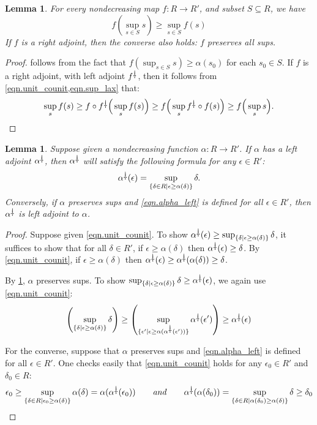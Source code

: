 \documentclass[11pt, one side, article]{memoir}
\theoremstyle{definition}
\theoremstyle{plain}
\newtheorem{lemma}[definitionx]{Lemma}
\renewcommand{\ss}{\subseteq}
\newcommand{\ldag}{^{\rotatebox{180}{$\dagger$}}}
\newcommand{\tn}[1]{\textnormal{#1}}
\newcommand{\hh}[2][]{#1 \tn{\textit{#2}} #1}
\newcommand{\qqand}{\hh[\qquad]{and}}
\begin{document}
\begin{lemma}\label{lemma.radj_sups}
For every nondecreasing map $f\colon R\to R'$, and subset $S\ss R$, we have
\begin{equation}\label{eqn.sup_lax}
	f(\sup_{s\in S}s)
	\geq
	\sup_{s\in S}f(s)
\end{equation}
If $f$ is a right adjoint, then the converse also holds: $f$ preserves all sups.
\end{lemma}
\begin{proof}
	 follows from the fact that $f(\sup_{s\in S}s)\geq\alpha (s_0)$ for each $s_0\in S$. If $f$ is a right adjoint, with left adjoint $f\ldag$, then it follows from \cref{eqn.unit_counit,eqn.sup_lax} that:
	\[
	\sup_s f(s)\geq
	f\circ f\ldag\Big(\sup_s f(s)\Big)\geq
	f\Big(\sup_s f\ldag\circ f(s)\Big)\geq
	f\Big(\sup_s s\Big).
	\qedhere
	\]
\end{proof}


\begin{lemma}\label{lemma.sup_formula}
Suppose given a nondecreasing function $\alpha\colon R\to R'$. If $\alpha$ has a left adjoint $\alpha\ldag$, then $\alpha\ldag$ will satisfy the following formula for any $\epsilon\in R'$:
\begin{equation}\label{eqn.alpha_left}
  \alpha\ldag(\epsilon)=\sup_{\{\delta\in R\mid \epsilon\geq\alpha(\delta)\}}\delta.
\end{equation}
Conversely, if $\alpha$ preserves sups and \eqref{eqn.alpha_left} is defined for all $\epsilon\in R'$, then $\alpha\ldag$ is left adjoint to $\alpha$.
\end{lemma}
\begin{proof}
Suppose given \eqref{eqn.unit_counit}. To show $\alpha\ldag(\epsilon)\geq\sup_{\{\delta\mid \epsilon\geq\alpha(\delta)\}}\delta$, it suffices to show that for all $\delta\in R'$, if $\epsilon\geq\alpha(\delta)$ then $\alpha\ldag(\epsilon)\geq\delta$. By \eqref{eqn.unit_counit}, if $\epsilon\geq\alpha(\delta)$ then $\alpha\ldag(\epsilon)\geq\alpha\ldag(\alpha(\delta))\geq\delta$. 

By \cref{lemma.radj_sups}, $\alpha$ preserves sups. To show 
$
\sup_{\{\delta\mid \epsilon\geq\alpha(\delta)\}}\delta
\geq
\alpha\ldag(\epsilon)
$, we again use \eqref{eqn.unit_counit}:
\[
\left(\sup_{\{\delta\mid \epsilon\geq\alpha(\delta)\}}\delta \right)\geq
\left(\sup_{\{\epsilon'\mid \epsilon\geq\alpha(\alpha\ldag(\epsilon'))\}}\alpha\ldag(\epsilon')\right)\geq\alpha\ldag(\epsilon)
\]

For the converse, suppose that $\alpha$ preserves sups and \eqref{eqn.alpha_left} is defined for all $\epsilon\in R'$. One checks easily that \eqref{eqn.unit_counit} holds for any $\epsilon_0\in R'$ and $\delta_0\in R$:
\[
	\epsilon_0
	\geq
  \sup_{\{\delta\in R\mid \epsilon_0\geq\alpha(\delta)\}}\alpha(\delta)
  =\alpha(\alpha\ldag(\epsilon_0))
  \qqand
  \alpha\ldag(\alpha(\delta_0))=
  \sup_{\{\delta\in R\mid \alpha(\delta_0)\geq\alpha(\delta)\}}\delta
  \geq\delta_0
\]

\end{proof}
\end{document}

